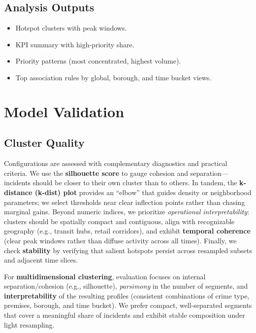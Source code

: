 \documentclass[11pt]{article}
\begin{document}
\subsection{Analysis Outputs}
\begin{itemize}[leftmargin=*]
  \item Hotspot clusters with peak windows.
  \item KPI summary with high-priority share.
  \item Priority patterns (most concentrated, highest volume).
  \item Top association rules by global, borough, and time bucket views.
\end{itemize}

\section{Model Validation}

\subsection{Cluster Quality}
Configurations are assessed with complementary diagnostics and practical criteria. We use the \textbf{silhouette score} to gauge cohesion and separation---incidents should be closer to their own cluster than to others. In tandem, the \textbf{k-distance (k-dist) plot} provides an ``elbow'' that guides density or neighborhood parameters; we select thresholds near clear inflection points rather than chasing marginal gains. Beyond numeric indices, we prioritize \emph{operational interpretability}: clusters should be spatially compact and contiguous, align with recognizable geography (e.g., transit hubs, retail corridors), and exhibit \textbf{temporal coherence} (clear peak windows rather than diffuse activity across all times). Finally, we check \textbf{stability} by verifying that salient hotspots persist across resampled subsets and adjacent time slices.

For \textbf{multidimensional clustering}, evaluation focuses on internal separation/cohesion (e.g., silhouette), \emph{parsimony} in the number of segments, and \textbf{interpretability} of the resulting profiles (consistent combinations of crime type, premises, borough, and time bucket). We prefer compact, well-separated segments that cover a meaningful share of incidents and exhibit stable composition under light resampling.
\end{document}

